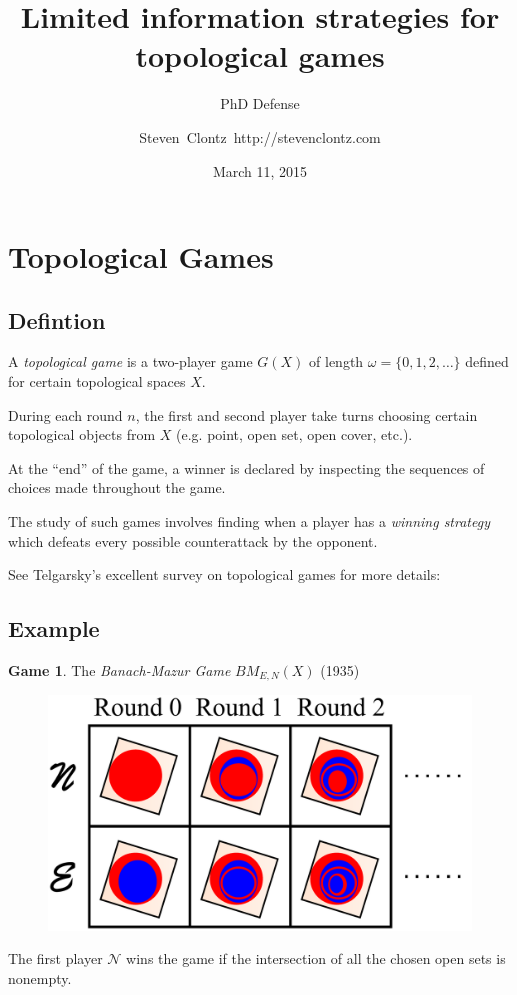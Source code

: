 \documentclass{beamer}
\title
{Limited information strategies for topological games}
\subtitle
{PhD Defense} %
\author%
{Steven~Clontz~http://stevenclontz.com}%
\institute[Auburn University] %
{
  Department of Mathematics and Statistics\\
  Auburn University}
\date[15-03-11] %
{March 11, 2015}
\theoremstyle{definition}
\newtheorem{game}[theorem]{Game}
\newcommand{\<}{\langle}
\renewcommand{\>}{\rangle}
\newcommand{\pl}[1]{\mathscr{#1}}
\newcommand{\term}{\textit}
\newcommand{\bmGame}[1]{{BM}_{E,N}(#1)}
\begin{document}
\renewcommand{\pause}{}
\newcommand{\vspacing}{\vspace{1em}}
\newcommand{\vpause}{\pause\vspacing}

\begin{frame}
  \titlepage
\end{frame}

\section{Topological Games}

\subsection{Defintion}

\begin{frame}
  A \term{topological game} is a two-player game $G(X)$ of length
  $\omega=\{0,1,2,\dots\}$ defined for certain topological spaces $X$.

  \vpause

  During each round $n$, the first and second player take turns choosing
  certain topological objects from $X$ (e.g. point, open set, open cover, etc.).

  \vpause

  At the ``end'' of the game, a winner is declared by inspecting the sequences
  of choices made throughout the game.

  \vpause

  The study of such games involves finding when a player has a
  \term{winning strategy} which defeats every possible counterattack by
  the opponent.

  \vpause

  {\tiny See Telgarsky's excellent survey on topological games for more
  details: \cite{MR892457}}
\end{frame}

\subsection{Example}

\begin{frame}
  \small
  \begin{game}
    The \term{Banach-Mazur Game}
    $\bmGame{X}$ (1935) \cite{MR666400}

    \begin{figure}
      \includegraphics[width=0.6\linewidth]{bmGame.pdf}
    \end{figure}

  The first player $\pl N$ wins the game if the intersection of all the chosen
  open sets is nonempty.
  \end{game}
\end{frame}
\end{document}
